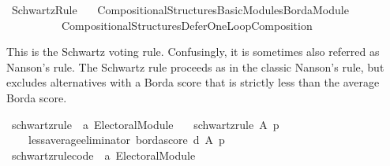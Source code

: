 %
\begin{isabellebody}%
%
%
\isadelimdocument
\isanewline
%
\endisadelimdocument
%
\isatagdocument
\isanewline
%
\isamarkuptrue%
%
\endisatagdocument
{\isafolddocument}%
%
\isadelimdocument
%
\endisadelimdocument
%
\isadelimtheory
%
\endisadelimtheory
%
\isatagtheory
{}\isamarkupfalse%
\ Schwartz{\isacharunderscore}{\kern0pt}Rule\isanewline
\ \ \ {\isachardoublequoteopen}Compositional{\isacharunderscore}{\kern0pt}Structures{\isacharslash}{\kern0pt}Basic{\isacharunderscore}{\kern0pt}Modules{\isacharslash}{\kern0pt}Borda{\isacharunderscore}{\kern0pt}Module{\isachardoublequoteclose}\isanewline
\ \ \ \ \ \ \ \ \ \ {\isachardoublequoteopen}Compositional{\isacharunderscore}{\kern0pt}Structures{\isacharslash}{\kern0pt}Defer{\isacharunderscore}{\kern0pt}One{\isacharunderscore}{\kern0pt}Loop{\isacharunderscore}{\kern0pt}Composition{\isachardoublequoteclose}\isanewline
{}%
\endisatagtheory
{\isafoldtheory}%
%
\isadelimtheory
%
\endisadelimtheory
%
\begin{isamarkuptext}%
This is the Schwartz voting rule. Confusingly, it is sometimes also referred as
Nanson's rule. The Schwartz rule proceeds as in the classic Nanson's rule, but
excludes alternatives with a Borda score that is strictly less than the
average Borda score.%
\end{isamarkuptext}\isamarkuptrue%
%
\isadelimdocument
%
\endisadelimdocument
%
\isatagdocument
%
\isamarkuptrue%
%
\endisatagdocument
{\isafolddocument}%
%
\isadelimdocument
%
\endisadelimdocument
{}\isamarkupfalse%
\ schwartz{\isacharunderscore}{\kern0pt}rule\ {\isacharcolon}{\kern0pt}{\isacharcolon}{\kern0pt}\ {\isachardoublequoteopen}{\isacharprime}{\kern0pt}a\ Electoral{\isacharunderscore}{\kern0pt}Module{\isachardoublequoteclose}\ \isanewline
\ \ {\isachardoublequoteopen}schwartz{\isacharunderscore}{\kern0pt}rule\ A\ p\ {\isacharequal}{\kern0pt}\isanewline
\ \ \ \ {\isacharparenleft}{\kern0pt}{\isacharparenleft}{\kern0pt}less{\isacharunderscore}{\kern0pt}average{\isacharunderscore}{\kern0pt}eliminator\ borda{\isacharunderscore}{\kern0pt}score{\isacharparenright}{\kern0pt}\ {\isasymcirclearrowleft}\isactrlsub {\isasymexists}\isactrlsub {\isacharbang}{\kern0pt}\isactrlsub d{\isacharparenright}{\kern0pt}\ A\ p{\isachardoublequoteclose}\isanewline
\isanewline
{}\isamarkupfalse%
\ schwartz{\isacharunderscore}{\kern0pt}rule{\isacharunderscore}{\kern0pt}code\ {\isacharcolon}{\kern0pt}{\isacharcolon}{\kern0pt}\ {\isachardoublequoteopen}{\isacharprime}{\kern0pt}a\ Electoral{\isacharunderscore}{\kern0pt}Module{\isachardoublequoteclose}\ \isanewline

\end{isabellebody}
